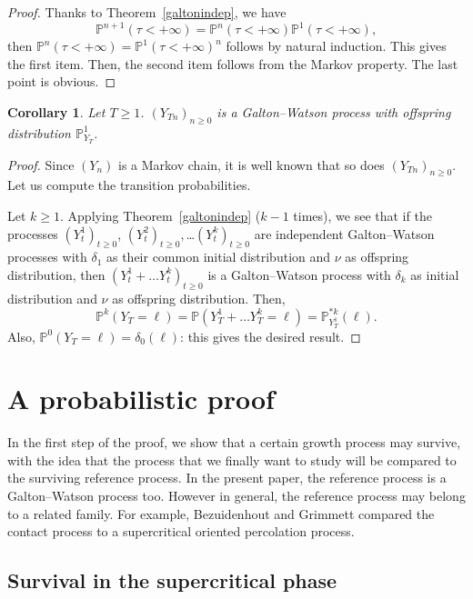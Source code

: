 \documentclass[svgnames]{amsart}
\renewcommand{\P}{\ensuremath{\mathbb{P}}}
\newcommand{\1}{\mathbbo{1}}
\newtheorem{coro}{Corollary}
\begin{document}
\begin{proof}
  Thanks to Theorem~\ref{galtonindep}, we have $$\P^{n+1}(\tau<+\infty)=\P^{n}(\tau<+\infty)\P^{1}(\tau<+\infty),$$ then  $\P^{n}(\tau<+\infty)=\P^{1}(\tau<+\infty)^n$ follows by natural induction. This gives the first item.
Then, the second item follows from the Markov property. The last point is obvious.
\end{proof}

\begin{coro}
\label{souschaine}
Let $T\ge 1$.  $(Y_{Tn})_{n\ge 0}$ is a Galton--Watson process with offspring distribution $\P^1_{Y_T}$.
\end{coro}
\begin{proof}
Since $(Y_n)$ is a Markov chain, it is well known that so does $(Y_{Tn})_{n\ge 0}$. Let us compute the transition probabilities.

Let $k\ge 1$.
Applying Theorem~\ref{galtonindep} ($k-1$ times), we see that if the processes $(Y^1_t)_{t\ge 0}$, $(Y^2_t)_{t\ge 0}, $\dots$ (Y^k_t)_{t\ge 0}$ are independent Galton--Watson processes with $\delta_1$ as their common initial distribution and $\nu$ as offspring distribution,
then $(Y^1_t+\dots Y^k_t)_{t\ge 0}$ is a  Galton--Watson process with  $\delta_{k}$ as initial distribution and $\nu$ as  offspring distribution.
Then,
$$\P^k(Y_T=\ell)=\P(Y^1_T+\dots Y^k_T=\ell)=\P_{Y^1_T}^{*k}(\ell).$$
Also, $\P^0(Y_T=\ell)=\delta_0(\ell)$: this gives the desired result.
\end{proof}

\section{A probabilistic proof}

In the first step of the proof, we show that a certain growth process may survive, with the idea that the process that we finally want to study will be compared to the surviving reference process.
In the present paper, the reference process is a Galton--Watson process too.
However in general, the reference process may belong to a related family.
For example, Bezuidenhout and Grimmett compared the contact process to a supercritical oriented percolation process.


\subsection{Survival in the supercritical phase}
\end{document}
